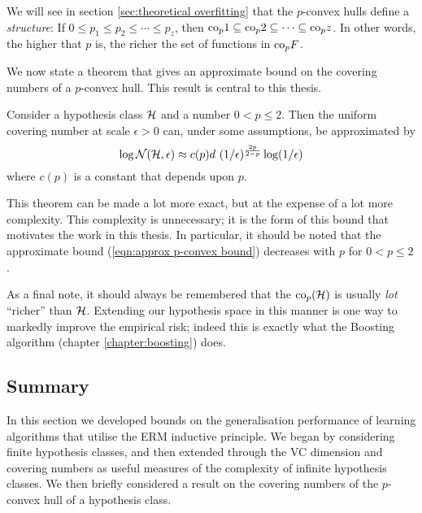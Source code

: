 We will see in section \ref{sec:theoretical overfitting} that the
$p$-convex hulls define a \emph{structure}:  If $0 \leq p_1 \leq p_2
\leq \cdots \leq p_z$, then $\mathrm{co}_p 1 \subseteq \mathrm{co}_p 2 \subseteq \cdots
\subseteq \mathrm{co}_p z$.  In other words, the higher that $p$ is, the richer
the set of functions in $\mathrm{co}_p{F}$.

We now state a theorem that gives an approximate bound on the covering
numbers of a $p$-convex hull.  This result is central to this thesis.

\begin{theorem}
Consider a hypothesis class $\mathcal{H}$ and a number $0 < p \leq 2$.  Then
the uniform covering number at scale $\epsilon > 0$ can, under some
assumptions,  be approximated by
%
\begin{equation}
\label{eqn:approx p-convex bound}
\log \mathcal{N}({\mathcal{H}}, {\epsilon}) \approx c(p) d\ (1 /
\epsilon)^{\frac{2p}{2-p}} \log (1 / \epsilon)
\end{equation}
%
where $c(p)$ is a constant that depends upon $p$.
\end{theorem}

This theorem can be made a lot more exact, but at the expense of a lot
more complexity.  This complexity is unnecessary; it is the form of
this bound that motivates the work in this thesis.  In particular, it
should be noted that the approximate bound (\ref{eqn:approx p-convex
bound}) decreases with $p$ for $0 < p \leq 2$.

As a final note, it should always be remembered that the
$\mathrm{co}_{p}(\mathcal{H})$ is usually \emph{lot} ``richer'' than $\mathcal{H}$.
Extending our hypothesis space in this manner is one way to markedly
improve the empirical risk; indeed this is exactly what the Boosting
algorithm (chapter \ref{chapter:boosting}) does.


\subsection{Summary}

In this section we developed bounds on the generalisation performance
of learning algorithms that utilise the ERM inductive principle.  We
began by considering finite hypothesis classes, and then extended
through the VC dimension and covering numbers as useful measures of
the complexity of infinite hypothesis classes.  We then briefly
considered a result on the covering numbers of the $p$-convex hull of
a hypothesis class.


